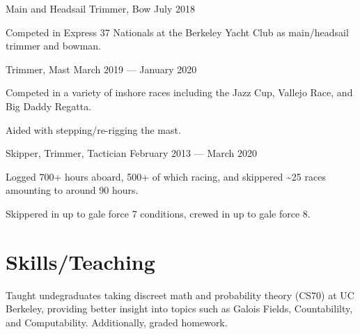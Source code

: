 \documentclass[10pt]{article}
\begin{document}
                {Main and Headsail Trimmer, Bow}
                {July 2018}
                \begin{accomplishments}
                  \item Competed in Express 37 Nationals at the Berkeley Yacht Club as main/headsail trimmer and bowman.
                \end{accomplishments}

                {Trimmer, Mast}
                {March 2019 --- January 2020}
                \begin{accomplishments}
                \item Competed in a variety of inshore races including the Jazz Cup, Vallejo Race, and Big Daddy Regatta.
                \item Aided with stepping/re-rigging the mast.
                \end{accomplishments}

								{Skipper, Trimmer, Tactician}
								{February 2013 --- March 2020}                  		
                \begin{accomplishments}
                  \item Logged 700+ hours aboard, 500+ of which racing, and skippered \textasciitilde 25 races amounting to around 90 hours.
                  \item Skippered in up to gale force 7 conditions, crewed in up to gale force 8. 
                 \end{accomplishments}

\section*{Skills/Teaching}
				{Taught undegraduates taking discreet math and probability theory (CS70) at UC Berkeley, providing 	better insight into topics such as Galois Fields, Countabililty, and Computability. Additionally, graded homework.}
\end{document}
